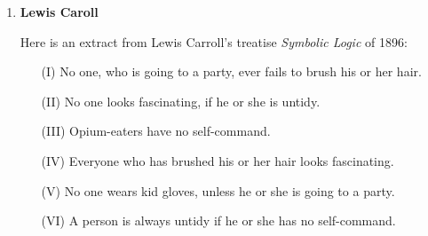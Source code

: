\documentclass{article}\usepackage{amsmath,amssymb,amsthm,tikz,tkz-graph,color,chngpage,soul,hyperref,csquotes,graphicx,floatrow}\newcommand*{\QEDB}{\hfill\ensuremath{\square}}\newtheorem*{prop}{Proposition}\usepackage[shortlabels]{enumitem}\usepackage[nobreak=true]{mdframed}\usetikzlibrary{matrix,calc}\MakeOuterQuote{"}\usepackage[margin=1in]{geometry} \newtheorem{theorem}{Theorem} \usepackage{circuitikz}
\begin{document}
\renewcommand{\labelenumii}{\Roman{enumii}}
\begin{enumerate}
\item \textbf{Lewis Caroll}

Here is an extract from Lewis Carroll's treatise \emph{Symbolic Logic} of 1896:
\begin{enumerate}
\item[(I)] No one, who is going to a party, ever fails to brush his or her hair.

\item[(II)] No one looks fascinating, if he or she is untidy.

\item[(III)] Opium-eaters have no self-command.

\item[(IV)] Everyone who has brushed his or her hair looks fascinating.

\item[(V)] No one wears kid gloves, unless he or she is going to a party.

\item[(VI)] A person is always untidy if he or she has no self-command.


\end{enumerate}
\end{enumerate}
\end{document}
